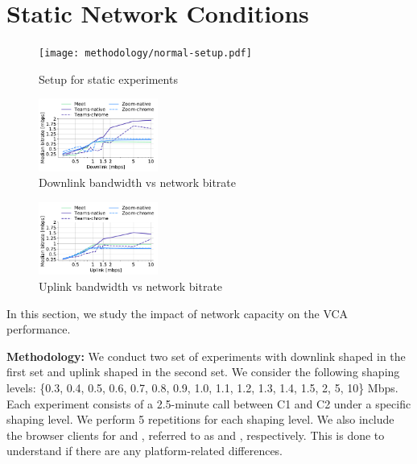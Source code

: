 \section{Static Network Conditions}\label{sec:static}



\begin{figure}[]
\centering
\texttt{[image: methodology/normal-setup.pdf]}
\caption{Setup for static experiments}
\label{fig:static_setup}
\end{figure}



\begin{figure}[]
\centering
    \includegraphics[width=0.35\textwidth,keepaspectratio]{figures/static/downlink.pdf}
    \caption{Downlink bandwidth vs network bitrate}
	\label{fig:downlink_bitrate}
\end{figure}



\begin{figure}[]
\centering
    \includegraphics[width=0.35\textwidth,keepaspectratio]{figures/static/uplink.pdf}
    \caption{Uplink bandwidth vs network bitrate}
	\label{fig:uplink_bitrate}
	
\end{figure}


In this section, we study the impact of network capacity on the VCA performance.  

\noindent\textbf{Methodology:} We conduct two set of experiments with downlink shaped in the first set and uplink shaped in the second set.  We consider the following shaping levels: \{0.3, 0.4, 0.5, 0.6, 0.7, 0.8, 0.9, 1.0, 1.1, 1.2, 1.3, 1.4, 1.5, 2, 5, 10\} Mbps. Each experiment consists of a 2.5-minute call between C1 and C2 under a specific shaping level. We  perform 5 repetitions for each shaping level. We also include the browser clients for \zoom and \teams, referred to as \zoombrowser and \teamsbrowser, respectively. This is done to understand if there are any platform-related differences. 

